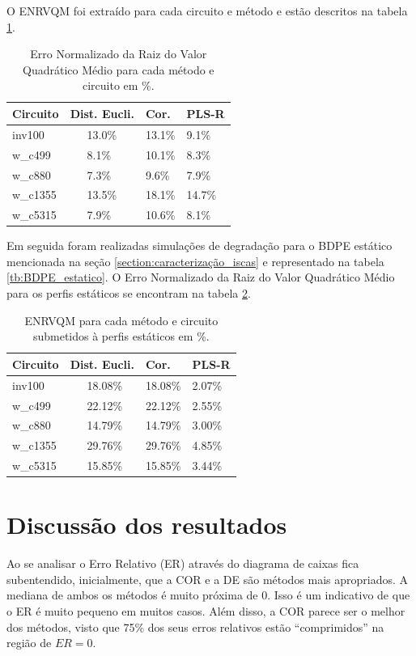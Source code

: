 O ENRVQM foi extraído para cada circuito e método e estão descritos na tabela \ref{tb:ENRVQM}.

\begin{table}[H]
	\centering
	\caption{Erro Normalizado da Raiz do Valor Quadrático Médio para cada método e circuito em \%.}
	\begin{tabular}{@{}l|l|l|l@{}}
		\toprule
		Circuito & Dist. Eucli. & Cor. & PLS-R \\ \midrule
		inv100 & \ \ \ 13.0\% & 13.1\% & 9.1\% \\
		w\_c499 & \ \ \ 8.1\% & 10.1\% & 8.3\% \\
		w\_c880 &  \ \ \ 7.3\% & 9.6\% & 7.9\% \\
		w\_c1355 & \ \ \ 13.5\% & 18.1\% & 14.7\% \\
		w\_c5315 & \ \ \ 7.9\% & 10.6\% & 8.1\% \\
		\bottomrule
	\end{tabular}
	\label{tb:ENRVQM}
\end{table}

Em seguida foram realizadas simulações de degradação para o BDPE estático mencionada na seção \ref{section:caracterização_iscas} e representado na tabela \ref{tb:BDPE_estatico}. O Erro Normalizado da Raiz do Valor Quadrático Médio para os perfis estáticos se encontram na tabela \ref{tb:ENRVQM_estatico}.
\begin{table}[H]
	\centering
	\caption{ENRVQM para cada método e circuito submetidos à perfis estáticos em \%.}
	\begin{tabular}{@{}l|l|l|l@{}}
		\toprule
		Circuito & Dist. Eucli. & Cor. & PLS-R \\ \midrule
		inv100 & \ \ \ 18.08\% & 18.08\% & 2.07\% \\
		w\_c499 & \ \ \ 22.12\% & 22.12\% & 2.55\% \\
		w\_c880 &  \ \ \ 14.79\% & 14.79\% & 3.00\% \\
		w\_c1355 & \ \ \ 29.76\% & 29.76\% & 4.85\% \\
		w\_c5315 & \ \ \ 15.85\% & 15.85\% & 3.44\% \\
		\bottomrule
	\end{tabular}
	\label{tb:ENRVQM_estatico}
\end{table}

\section{Discussão dos resultados}
Ao se analisar o Erro Relativo (ER) através do diagrama de caixas fica subentendido, inicialmente, que a COR e a DE são métodos mais apropriados. A mediana de ambos os métodos é muito próxima de $0$. Isso é um indicativo de que o ER é muito pequeno em muitos casos. Além disso, a COR parece ser o melhor dos métodos, visto que 75\% dos seus erros relativos estão ``comprimidos'' na região de $ER=0$. 

